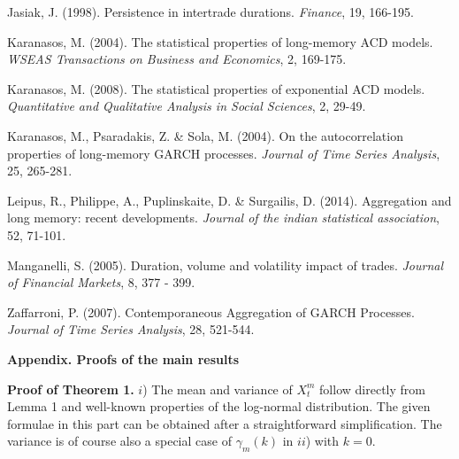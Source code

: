\documentclass[12pt]{article}
\begin{document}
\begin{description}
\item
Jasiak, J. (1998). Persistence in intertrade durations. \textsl{Finance}, 19, 166-195.


\item
Karanasos, M. (2004). The statistical properties of long-memory ACD models. \textsl{WSEAS Transactions on Business and Economics}, 2, 169-175.

\item
Karanasos, M. (2008). The statistical properties of exponential ACD models. \textsl{Quantitative
and Qualitative Analysis in Social Sciences}, 2, 29-49.

\item
Karanasos, M., Psaradakis, Z. \& Sola, M. (2004). On the autocorrelation properties of long-memory GARCH processes. \textsl{Journal of Time Series Analysis}, 25, 265-281.

\item
Leipus, R., Philippe, A., Puplinskaite, D. \& Surgailis, D. (2014). Aggregation and long memory: recent developments. \textsl{Journal of the indian statistical association}, 52, 71-101.

\item
Manganelli, S. (2005). Duration, volume and volatility impact of trades. {\it Journal of Financial Markets},
8, 377 - 399.



\item Zaffarroni, P. (2007). Contemporaneous Aggregation of GARCH Processes. {\it Journal of Time Series Analysis}, 28, 521-544.
\end{description}



\newpage


{\large \textbf{Appendix. Proofs of the main results}}


\textbf{Proof of Theorem 1.} 
$i$) The mean and variance of $X_{t}^m$ follow directly from Lemma 1 and well-known properties of the log-normal distribution. The given formulae in this part can be obtained after a straightforward simplification. The variance is of course also a special case of $\gamma_m(k)$ in $ii$) with
$k=0$. 
\end{document}
